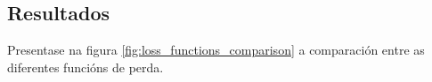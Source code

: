 \subsection{Resultados}
\label{subsec:Resultados-loss}

Presentase na figura \ref{fig:loss_functions_comparison} a comparación entre as diferentes funcións de perda.





